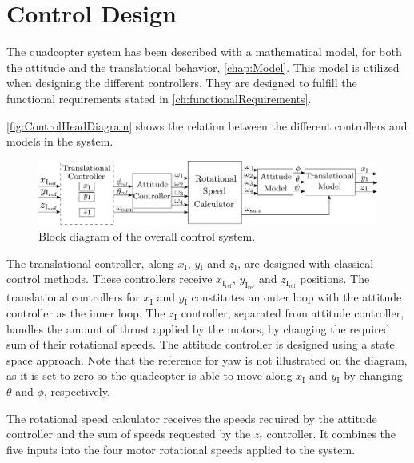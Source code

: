 \chapter{Control Design}\label{chap:Control}
The quadcopter system has been described with a mathematical model, for both the attitude and the translational behavior, \autoref{chap:Model}. This model is utilized when designing the different controllers. They are designed to fulfill the functional requirements stated in \autoref{ch:functionalRequirements}.

\autoref{fig:ControlHeadDiagram} shows the relation between the different controllers and models in the system.

%
\begin{figure}[H]
	\centering
	\includegraphics[width=1 \textwidth]{figures/generalcontroldiagram2}
	\caption{Block diagram of the overall control system.}
	\label{fig:ControlHeadDiagram}
\end{figure}
%
The translational controller, along $x_{\mathrm{I}}$, $y\mathrm{_I}$ and $z\mathrm{_I}$, are designed with classical control methods. These controllers receive $x_\mathrm{I_{ref}}$, $y_\mathrm{I_{ref}}$ and $z_\mathrm{I_{ref}}$ positions. The translational controllers for $x\mathrm{_I}$ and $y\mathrm{_I}$ constitutes an outer loop with the attitude controller as the inner loop. The $z\mathrm{_I}$ controller, separated from attitude controller, handles the amount of thrust applied by the motors, by changing the required sum of their rotational speeds. The attitude controller is designed using a state space approach. Note that the reference for yaw is not illustrated on the diagram, as it is set to zero so the quadcopter is able to move along $x_{\mathrm{I}}$ and $y\mathrm{_I}$ by changing $\theta$ and $\phi$, respectively.

The rotational speed calculator receives the speeds required by the attitude controller and the sum of speeds requested by the $z\mathrm{_I}$ controller. It combines the five inputs into the four motor rotational speeds applied to the system.

